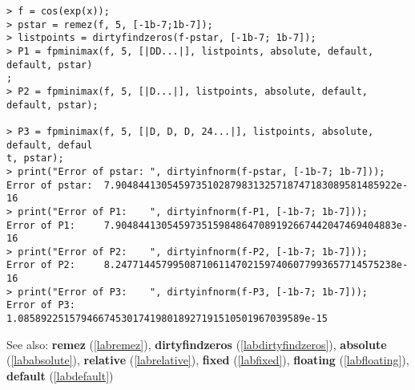 \begin{center}\begin{minipage}{15cm}\begin{Verbatim}[frame=single]
> f = cos(exp(x));
> pstar = remez(f, 5, [-1b-7;1b-7]);
> listpoints = dirtyfindzeros(f-pstar, [-1b-7; 1b-7]);
> P1 = fpminimax(f, 5, [|DD...|], listpoints, absolute, default, default, pstar)
;
> P2 = fpminimax(f, 5, [|D...|], listpoints, absolute, default, default, pstar);

> P3 = fpminimax(f, 5, [|D, D, D, 24...|], listpoints, absolute, default, defaul
t, pstar);
> print("Error of pstar: ", dirtyinfnorm(f-pstar, [-1b-7; 1b-7]));
Error of pstar:  7.9048441305459735102879831325718747183089581485922e-16
> print("Error of P1:    ", dirtyinfnorm(f-P1, [-1b-7; 1b-7]));
Error of P1:     7.9048441305459735159848647089192667442047469404883e-16
> print("Error of P2:    ", dirtyinfnorm(f-P2, [-1b-7; 1b-7]));
Error of P2:     8.2477144579950871061147021597406077993657714575238e-16
> print("Error of P3:    ", dirtyinfnorm(f-P3, [-1b-7; 1b-7]));
Error of P3:     1.08589225157946674530174198018927191510501967039589e-15
\end{Verbatim}
\end{minipage}\end{center}
See also: \textbf{remez} (\ref{labremez}), \textbf{dirtyfindzeros} (\ref{labdirtyfindzeros}), \textbf{absolute} (\ref{lababsolute}), \textbf{relative} (\ref{labrelative}), \textbf{fixed} (\ref{labfixed}), \textbf{floating} (\ref{labfloating}), \textbf{default} (\ref{labdefault})
